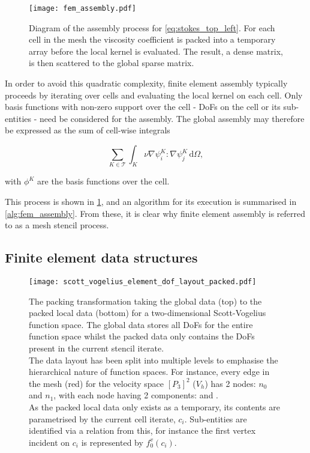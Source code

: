 \documentclass[thesis]{subfiles}
\begin{document}
\begin{figure}
  \centering
  \texttt{[image: fem\_assembly.pdf]}
  \caption{
    Diagram of the assembly process for \cref{eq:stokes_top_left}.
    For each cell in the mesh the viscosity coefficient is packed into a temporary array before the local kernel is evaluated.
    The result, a dense matrix, is then scattered to the global sparse matrix.
  }
  \label{fig:fem_assembly}
\end{figure}

In order to avoid this quadratic complexity, finite element assembly typically proceeds by iterating over cells and evaluating the local kernel on each cell.
Only basis functions with non-zero support over the cell - DoFs on the cell or its sub-entities - need be considered for the assembly.
The global assembly may therefore be expressed as the sum of cell-wise integrals


\begin{equation}
  \sum_{K \in \mathcal{T}} \int_K \nu \nabla \psi_i^K : \nabla \psi_j^K \, \textrm{d}\Omega,
\end{equation}

\noindent
with $\phi^K$ are the basis functions over the cell.

This process is shown in \cref{fig:fem_assembly}, and an algorithm for its execution is summarised in \cref{alg:fem_assembly}.
From these, it is clear why finite element assembly is referred to as a mesh stencil process.

\subsection{Finite element data structures}

\begin{figure}
  \centering
  \texttt{[image: scott\_vogelius\_element\_dof\_layout\_packed.pdf]}
  \caption{
    The packing transformation taking the global data (top) to the packed local data (bottom) for a two-dimensional Scott-Vogelius function space.
    The global data stores all DoFs for the entire function space whilst the packed data only contains the DoFs present in the current stencil iterate.
    \\
    The data layout has been split into multiple levels to emphasise the hierarchical nature of function spaces.
    For instance, every edge in the mesh (red) for the velocity space $[P_3]^2$ ($V_h$) has 2 nodes: $n_0$ and $n_1$, with each node having 2 components:  and .
    \\
    As the packed local data only exists as a temporary, its contents are parametrised by the current cell iterate, $c_i$.
    Sub-entities are identified via a relation from this, for instance the first vertex incident on $c_i$ is represented by $f_0^v(c_i)$.
  }
  \label{fig:scott_vogelius_element_dof_layout_packed}
\end{figure}
\end{document}

